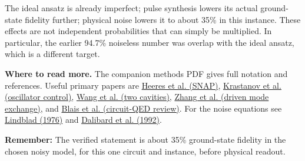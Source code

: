 \documentclass[11pt]{article}
\newcommand{\takeaway}[1]{\par\medskip\noindent\textbf{Remember:} #1\par}
\begin{document}
The ideal ansatz is already imperfect; pulse synthesis lowers its actual
ground-state fidelity further; physical noise lowers it to about 35\% in
this instance. These effects are not independent probabilities that can
simply be multiplied. In particular, the earlier 94.7\% noiseless number
was overlap with the ideal ansatz, which is a different target.

\textbf{Where to read more.} The companion methods PDF gives full notation
and references. Useful primary papers are
\href{https://arxiv.org/abs/1503.01496}{Heeres et al. (SNAP)},
\href{https://doi.org/10.1103/PhysRevA.92.040303}{Krastanov et al. (oscillator control)},
\href{https://arxiv.org/abs/1601.05505}{Wang et al. (two cavities)},
\href{https://arxiv.org/abs/1808.07960}{Zhang et al. (driven mode exchange)}, and
\href{https://arxiv.org/abs/2005.12667}{Blais et al. (circuit-QED review)}.
For the noise equations see
\href{https://doi.org/10.1007/BF01608499}{Lindblad (1976)} and
\href{https://doi.org/10.1103/PhysRevLett.68.580}{Dalibard et al. (1992)}.
\takeaway{The verified statement is about 35\% ground-state fidelity in the chosen noisy model, for this one circuit and instance, before physical readout.}
\end{document}
